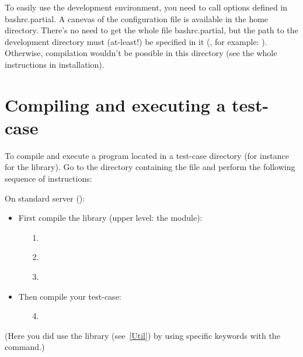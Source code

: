 To easily use the development environment, you need to call options
defined in bashrc.partial. 
A canevas of the configuration file
 is available in the home directory. There's no need to get the
whole file bashrc.partial, but the path to the development directory
must (at-least!) be specified in it (, for example: ). Otherwise, compilation wouldn't
be possible in this directory (see the whole instructions in
installation).





\section{Compiling and executing a test-case}




To compile  and execute a program
located in a test-case directory (for instance
 for the  library). 
Go to the
directory containing the  file and   perform the
following sequence of instructions:

On standard server ():
\begin{itemize}
\item First compile the library (upper level: the module):
    \begin{itemize}
    \item[1.] 
    \item[2.] 
    \item[3.] 
    \end{itemize}
\item Then compile your test-case:
    \begin{itemize}
    \item[4.] 
\end{itemize}
\end{itemize}
(Here you did use the   library (see~\ref{Util}) by using
specific keywords with the  command.)\\


